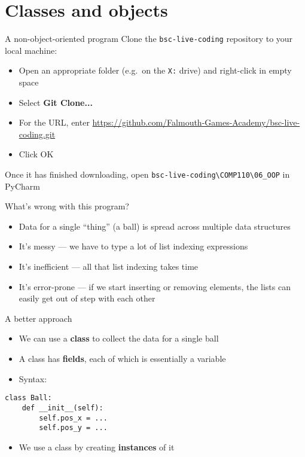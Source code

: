 \part{Classes and objects}
\frame{\partpage}

\begin{frame}{A non-object-oriented program}
	Clone the \texttt{bsc-live-coding} repository to your local machine:
	\begin{itemize}
		\item Open an appropriate folder (e.g.\ on the \texttt{X:} drive) and right-click in empty space
		\item Select \textbf{Git Clone...}
		\item For the URL, enter \url{https://github.com/Falmouth-Games-Academy/bsc-live-coding.git}
		\item Click OK
	\end{itemize}
	Once it has finished downloading, open \texttt{bsc-live-coding\textbackslash{}COMP110\textbackslash{}06\_OOP} in PyCharm
\end{frame}

\begin{frame}{What's wrong with this program?}
	\begin{itemize}
		\pause\item Data for a single ``thing'' (a ball) is spread across multiple data structures
		\pause\item It's messy --- we have to type a lot of list indexing expressions
		\pause\item It's inefficient --- all that list indexing takes time
		\pause\item It's error-prone --- if we start inserting or removing elements, the lists can easily get out of step with each other
	\end{itemize}
\end{frame}

\begin{frame}[fragile]{A better approach}
	\begin{itemize}
		\pause\item We can use a \textbf{class} to collect the data for a single ball
		\pause\item A class has \textbf{fields}, each of which is essentially a variable
		\pause\item Syntax:
	\end{itemize}
	\begin{lstlisting}
class Ball:
	def __init__(self):
		self.pos_x = ...
		self.pos_y = ...
	\end{lstlisting}
	\begin{itemize}
		\pause\item We use a class by creating \textbf{instances} of it
	\end{itemize}
\end{frame}

